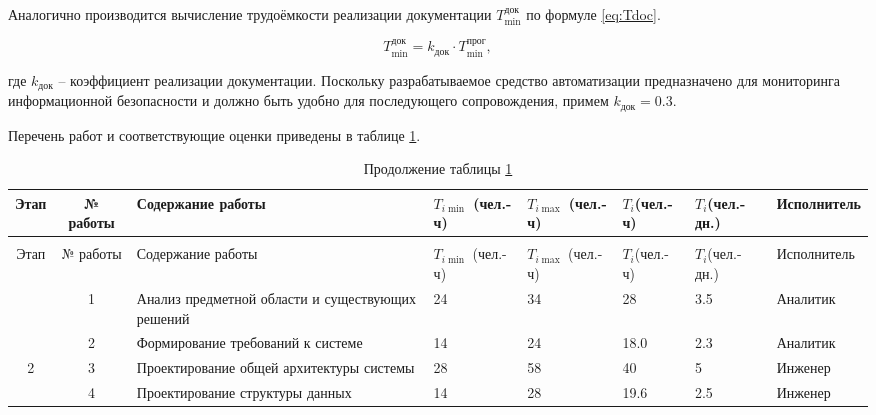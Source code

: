 Аналогично производится вычисление трудоёмкости реализации документации $T_{\min}^{\text{док}}$ по формуле \eqref{eq:Tdoc}.

\begin{equation}\label{eq:Tdoc}
T_{\min}^{\text{док}} = k_{\text{док}}\cdot T_{\min}^{\text{прог}},
\end{equation}

где $k_{\text{док}}$ -- коэффициент реализации документации. Поскольку разрабатываемое средство автоматизации предназначено для мониторинга информационной безопасности и должно быть удобно для последующего сопровождения, примем $k_{\text{док}} = 0.3$.

Перечень работ и соответствующие оценки приведены в таблице \ref{tab:tasks_trud}.

{
\fontsize{10}{10}\selectfont
\setlength{\tabcolsep}{3pt}

\begin{longtable}{|c|c|p{4cm}|p{1.6cm}|p{1.6cm}|p{1.5cm}|p{1.6cm}|p{2.5cm}|}
    \caption{Перечень работ} \label{tab:tasks_trud} \\
    \hline
    Этап & № работы & Содержание работы & $T_{i\min}$ (чел.-ч) & $T_{i\max}$ (чел.-ч) & $T_i$\newline(чел.-ч) & $T_i$\newline(чел.-дн.) & Исполнитель \\
    \hline
    \endfirsthead

    \caption*{Продолжение таблицы \ref{tab:tasks_trud}}\\ \hline
    Этап & № работы & Содержание работы & $T_{i\min}$ (чел.-ч) & $T_{i\max}$ (чел.-ч) & $T_i$\newline(чел.-ч) & $T_i$\newline(чел.-дн.) & Исполнитель \\ \hline
    \endhead

    \hline
    \endfoot

    \hline
    \endlastfoot

    \multirow{2}{*}{1}
        & 1  & Анализ предметной области и существующих решений
        & 24 & 34  & 28  & 3.5  & Аналитик \\ \cline{2-8}
        & 2  & Формирование требований к системе
        & 14 & 24  & 18.0  & 2.3  & Аналитик \\ \hline

    \multirow{2}{*}{2}
        & 3  & Проектирование общей архитектуры системы
        & 28 & 58  & 40 & 5  & Инженер \\ \cline{2-8}
        & 4  & Проектирование структуры данных
        & 14 & 28  & 19.6  & 2.5  & Инженер \\ \hline


\end{longtable}}
